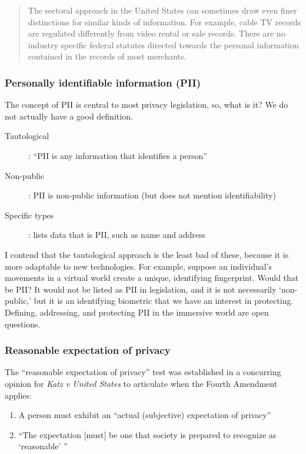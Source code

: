 \begin{quote}
The sectoral approach in the United States can sometimes draw even finer distinctions for similar kinds of information. For example, cable TV records are regulated differently from video rental or sale records. There are no industry specific federal statutes directed towards the personal information contained in the records of most merchants.\cite{solove2018information}
\end{quote} 

\subsubsection{Personally identifiable information (PII)}
The concept of PII is central to most privacy legislation, so, what is it? We do not actually have a good definition.
\begin{description}
	\item[Tautological]: ``PII is any information that identifies a person''
	\item[Non-public]: PII is non-public information (but does not mention identifiability)
	\item[Specific types]: lists data that is PII, such as name and address
\end{description}

I contend that the tautological approach is the least bad of these, because it is more adaptable to new technologies. For example, suppose an individual's movements in a virtual world create a unique, identifying fingerprint. Would that be PII? It would not be listed as PII in legislation, and it is not necessarily `non-public,' but it is an identifying biometric that we have an interest in protecting. Defining, addressing, and protecting PII in the immersive world are open questions.


\subsubsection{Reasonable expectation of privacy}
The ``reasonable expectation of privacy'' test was established in a concurring opinion for \emph{Katz v United States}\cite{katz1967} to articulate when the Fourth Amendment applies:
\begin{enumerate}
	\item A person must exhibit an ``actual (subjective) expectation of privacy''
	\item ``The expectation [must] be one that society is  prepared to recognize as `reasonable' ''
\end{enumerate}

